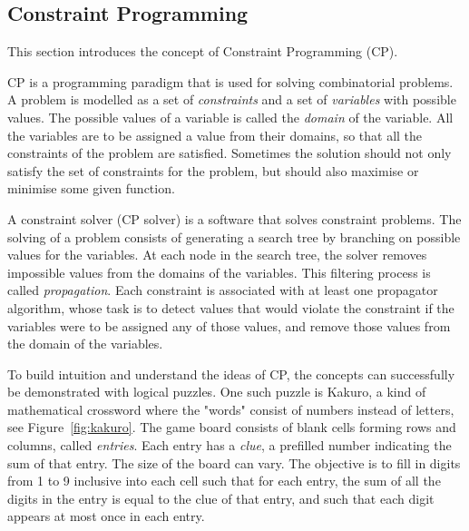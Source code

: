 \documentclass[a4paper,11pt]{article}
\numberwithin{equation}{section}
\begin{document}
\subsection{Constraint Programming}
\label{bg:cp}
This section introduces the concept of Constraint Programming (CP).

CP is a programming paradigm that is used for solving
combinatorial problems. A problem is
modelled as a set of \emph{constraints} and a
set of \emph{variables} with possible values. The possible values of 
a variable is called the \emph{domain} of the variable.
All the variables are to be assigned a value
from their domains, so that all the constraints of the problem
are satisfied. Sometimes the solution should not only satisfy the set of constraints for the
problem, but should also maximise or minimise some given function.

A constraint solver (CP solver) is a software that solves constraint problems.
The solving of a problem consists of generating a search tree by branching
on possible values for the variables. At each node in the search tree,
the solver removes impossible values from the domains of the variables.
This filtering process is called \emph{propagation}. Each constraint is
associated with at least one propagator algorithm, whose task is to detect
values that would violate the constraint if the variables were to be assigned
any of those values, and remove those values from the domain of the variables.

To build intuition and understand the ideas of CP,
the concepts can successfully be demonstrated with logical puzzles. One such
puzzle is Kakuro, a kind of mathematical crossword where the "words" consist
of numbers instead of letters, see Figure~\ref{fig:kakuro}.
The game board consists of 
blank cells forming rows and columns, called \emph{entries}.
Each entry has a \emph{clue}, a prefilled number indicating the sum of that entry.
The size of the board can vary.
The objective is to fill
in digits from 1 to 9 inclusive into each cell such that for each entry,
the sum of all the digits in the entry is equal to the clue of that entry,
and such that each digit appears at most once in each entry.
\end{document}
